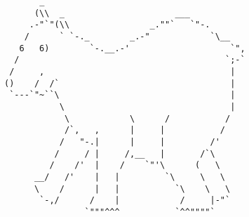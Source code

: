 \documentclass{article}
\begin{document}
\vfill
\centering
\tiny
\begin{BVerbatim}
       _ 
      (\\  _                      ___
     .-"`"(\\                _.""`   `"-.
    /      ` `-._        _.-"            `\__
   6   6)        `-.__.-'                    `",
  /                                         `;-`
 /     ,                                     |
()    /  /`                                  |
 `---`"~``\                                  |
           \                                 |
            \            \      /           /
            /`,   ,      |     |           /
           /   "-.|      |     |         /'
          /     / |     /,__   |       /`\
         /    /'  |    /    `"'\      (   \
      __/   /'    |   |         `\     \   \
      \    /      |   |           `\    \   \
       `-,/      /    |            /     |-"`
                `"""^^^           `^^""""`
\end{BVerbatim}
\end{document}
